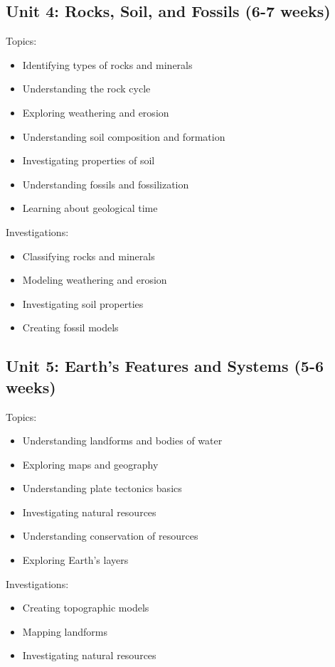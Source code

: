 \documentclass[11pt,letterpaper]{report}
\begin{document}
\subsection{Unit 4: Rocks, Soil, and Fossils (6-7 weeks)}

Topics:
\begin{itemize}
\item Identifying types of rocks and minerals
\item Understanding the rock cycle
\item Exploring weathering and erosion
\item Understanding soil composition and formation
\item Investigating properties of soil
\item Understanding fossils and fossilization
\item Learning about geological time
\end{itemize}

Investigations:
\begin{itemize}
\item Classifying rocks and minerals
\item Modeling weathering and erosion
\item Investigating soil properties
\item Creating fossil models
\end{itemize}

\subsection{Unit 5: Earth's Features and Systems (5-6 weeks)}

Topics:
\begin{itemize}
\item Understanding landforms and bodies of water
\item Exploring maps and geography
\item Understanding plate tectonics basics
\item Investigating natural resources
\item Understanding conservation of resources
\item Exploring Earth's layers
\end{itemize}

Investigations:
\begin{itemize}
\item Creating topographic models
\item Mapping landforms
\item Investigating natural resources
\end{itemize}
\end{document}
